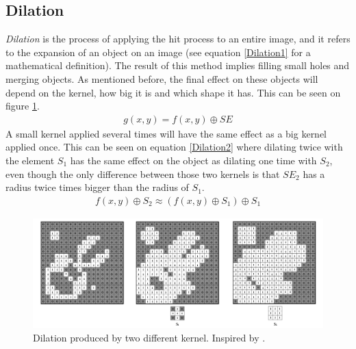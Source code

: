 \subsection{Dilation}
\textit{Dilation} is the process of applying the hit process to an entire image, and it refers to the expansion of an object on an image (see equation \ref{Dilation1} for a mathematical definition). The result of this method implies filling small holes and merging objects. As mentioned before, the final effect on these objects will depend on the kernel, how big it is and which shape it has. This can be seen on figure \ref{fig:Dilation}. 
\begin{equation}
\begin{aligned}
{g(x, y)}={f(x,y)}\oplus{SE}
\label{Dilation1}
	\end{aligned}
\end{equation}
A small kernel applied several times will have the same effect as a big kernel applied once. This can be seen on equation \ref{Dilation2} where dilating twice with the element {$S_{1}$} has the same effect on the object as dilating one time with {$S_{2}$}, even though the only difference between those two kernels is that {$SE_{2}$} has a radius twice times bigger than the radius of {$S_{1}$}.
\begin{equation}
\begin{aligned}
{f(x,y)}\oplus{S_{2}} \approx ({f(x,y)}\oplus{S_{1}})\oplus{S_{1}}
\label{Dilation2}
	\end{aligned}
\end{equation}
\begin{figure}[htbp]
\centering
\includegraphics[width=1\textwidth]{Pictures/Theory/Dilation.png}
\caption{Dilation produced by two different kernel. Inspired by \citep{ip_book}.}
\label{fig:Dilation}
\end{figure}

